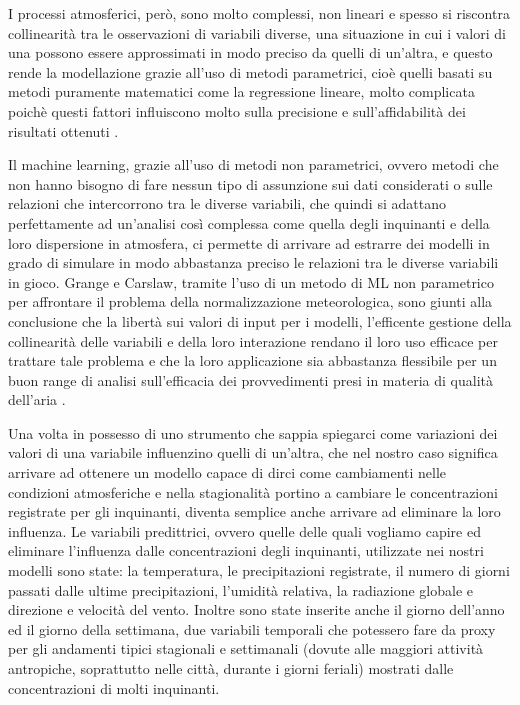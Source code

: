 \documentclass[a4paper]{report}
\begin{document}
I processi atmosferici, però, sono molto complessi, non lineari e spesso si riscontra collinearità tra le osservazioni di variabili diverse, una situazione in cui i valori di una possono essere approssimati in modo preciso da quelli di un'altra, e questo rende la modellazione grazie all'uso di metodi parametrici, cioè quelli basati su metodi puramente matematici come la regressione lineare, molto complicata poichè questi fattori influiscono molto sulla precisione e sull'affidabilità dei risultati ottenuti \cite{gunst1975regression}. 

Il machine learning, grazie all'uso di metodi non parametrici, ovvero metodi che non hanno bisogno di fare nessun tipo di assunzione sui dati considerati o sulle relazioni che intercorrono tra le diverse variabili, che quindi si adattano perfettamente ad un'analisi così complessa come quella degli inquinanti e della loro dispersione in atmosfera, ci permette di arrivare ad estrarre dei modelli in grado di simulare in modo abbastanza preciso le relazioni tra le diverse variabili in gioco.  
Grange e Carslaw, tramite l'uso di un metodo di ML non parametrico per affrontare il problema della normalizzazione meteorologica, sono giunti alla conclusione che la libertà sui valori di input per i modelli, l'efficente gestione della collinearità delle variabili e della loro interazione rendano il loro uso efficace per trattare tale problema e che la loro applicazione sia abbastanza flessibile per un buon range di analisi sull'efficacia dei provvedimenti presi in materia di qualità dell'aria \cite{grange2019using}.

Una volta in possesso di uno strumento che sappia spiegarci come variazioni dei valori di una variabile influenzino quelli di un'altra, che nel nostro caso significa arrivare ad ottenere un modello capace di dirci come cambiamenti nelle condizioni atmosferiche e nella stagionalità portino a cambiare le concentrazioni registrate per gli inquinanti, diventa semplice anche arrivare ad eliminare la loro influenza. Le variabili predittrici, ovvero quelle delle quali vogliamo capire ed eliminare l'influenza dalle concentrazioni degli inquinanti, utilizzate nei nostri modelli sono state: la temperatura, le precipitazioni registrate, il numero di giorni passati dalle ultime precipitazioni, l'umidità relativa, la radiazione globale e direzione e velocità del vento. Inoltre sono state inserite anche il giorno dell'anno ed il giorno della settimana, due variabili temporali che potessero fare da proxy per gli andamenti tipici stagionali e settimanali (dovute alle maggiori attività antropiche, soprattutto nelle città, durante i giorni feriali) mostrati dalle concentrazioni di molti inquinanti. 
\end{document}
